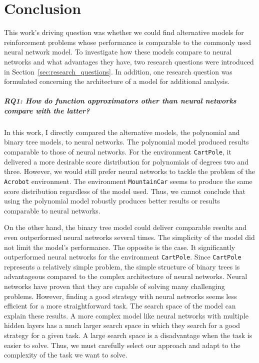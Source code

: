 
\chapter{Conclusion}
\label{ch:conclusions}

This work's driving question was whether we could find alternative models for reinforcement problems whose performance is comparable to the commonly used neural network model. To investigate how these models compare to neural networks and what advantages they have, two research questions were introduced in Section~\ref{sec:research_questions}. In addition, one research question was formulated concerning the architecture of a model for additional analysis.

\paragraph*{RQ1: How do function approximators other than neural networks compare with the latter?} In this work, I directly compared the alternative models, the polynomial and binary tree models, to neural networks. The polynomial model produced results comparable to those of neural networks. For the environment \verb|CartPole|, it delivered a more desirable score distribution for polynomials of degrees two and three. However, we would still prefer neural networks to tackle the problem of the \verb|Acrobot| environment. The environment \verb|MountainCar| seems to produce the same score distribution regardless of the model used. Thus, we cannot conclude that using the polynomial model robustly produces better results or results comparable to neural networks.

On the other hand, the binary tree model could deliver comparable results and even outperformed neural networks several times. The simplicity of the model did not limit the model's performance. The opposite is the case. It significantly outperformed neural networks for the environment \verb|CartPole|. Since \verb|CartPole| represents a relatively simple problem, the simple structure of binary trees is advantageous compared to the complex architecture of neural networks. Neural networks have proven that they are capable of solving many challenging problems. However, finding a good strategy with neural networks seems less efficient for a more straightforward task. The search space of the model can explain these results. A more complex model like neural networks with multiple hidden layers has a much larger search space in which they search for a good strategy for a given task. A large search space is a disadvantage when the task is easier to solve. Thus, we must carefully select our approach and adapt to the complexity of the task we want to solve.

